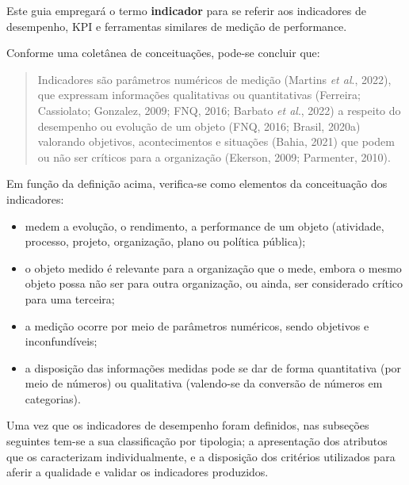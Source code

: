 \documentclass[
  letterpaper,
  DIV=11,
  numbers=noendperiod]{scrreprt}
\begin{document}
\begin{tcolorbox}[enhanced jigsaw, title=\textcolor{quarto-callout-caution-color}{\faFire}\hspace{0.5em}{Importante}, bottomrule=.15mm, arc=.35mm, bottomtitle=1mm, toprule=.15mm, coltitle=black, opacityback=0, colback=white, rightrule=.15mm, breakable, toptitle=1mm, leftrule=.75mm, titlerule=0mm, opacitybacktitle=0.6, colbacktitle=quarto-callout-caution-color!10!white, left=2mm, colframe=quarto-callout-caution-color-frame]

Este guia empregará o termo \textbf{indicador} para se referir aos
indicadores de desempenho, KPI e ferramentas similares de medição de
performance.

\end{tcolorbox}

Conforme uma coletânea de conceituações, pode-se concluir que:

\begin{quote}
Indicadores são parâmetros numéricos de medição (Martins \emph{et al}.,
2022), que expressam informações qualitativas ou quantitativas
(Ferreira; Cassiolato; Gonzalez, 2009; FNQ, 2016; Barbato \emph{et al}.,
2022) a respeito do desempenho ou evolução de um objeto (FNQ, 2016;
Brasil, 2020a) valorando objetivos, acontecimentos e situações (Bahia,
2021) que podem ou não ser críticos para a organização (Ekerson, 2009;
Parmenter, 2010).
\end{quote}

Em função da definição acima, verifica-se como elementos da conceituação
dos indicadores:

\begin{itemize}
\item
  medem a evolução, o rendimento, a performance de um objeto (atividade,
  processo, projeto, organização, plano ou política pública);
\item
  o objeto medido é relevante para a organização que o mede, embora o
  mesmo objeto possa não ser para outra organização, ou ainda, ser
  considerado crítico para uma terceira;
\item
  a medição ocorre por meio de parâmetros numéricos, sendo objetivos e
  inconfundíveis;
\item
  a disposição das informações medidas pode se dar de forma quantitativa
  (por meio de números) ou qualitativa (valendo-se da conversão de
  números em categorias).
\end{itemize}

Uma vez que os indicadores de desempenho foram definidos, nas subseções
seguintes tem-se a sua classificação por tipologia; a apresentação dos
atributos que os caracterizam individualmente, e a disposição dos
critérios utilizados para aferir a qualidade e validar os indicadores
produzidos.
\end{document}
